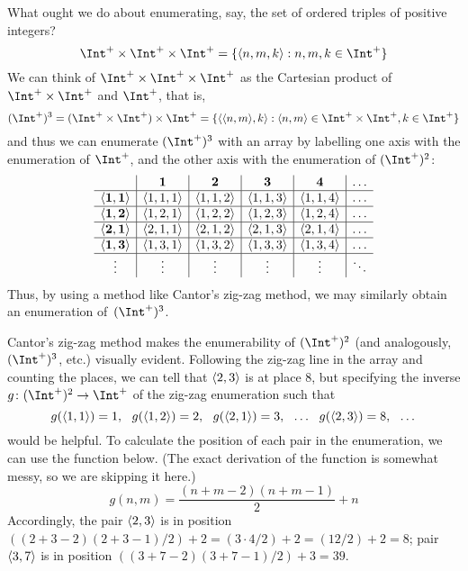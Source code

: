\documentclass[../../../include/open-logic-section]{subfiles}
\begin{document}
\begin{explain}
What ought we do about enumerating, say, the set of ordered triples
of positive integers?
\[
\Int^+ \times \Int^+ \times \Int^+ = \Setabs{\tuple{n,m,k}}{n,m,k \in \Int^+}
\]
We can think of $\Int^+ \times \Int^+ \times \Int^+$ as the Cartesian
product of $\Int^+ \times \Int^+$ and $\Int^+$, that is,
\[
(\Int^+)^3 = (\Int^+ \times \Int^+) \times \Int^+ =
\Setabs{\tuple{\tuple{n,m},k}}{\tuple{n,m} \in \Int^+ \times \Int^+, k
  \in \Int^+ }
\]
and thus we can enumerate $(\Int^+)^3$ with an array by labelling one
axis with the enumeration of $\Int^+$, and the other axis with the
enumeration of $(\Int^+)^2$:
\[
\begin{array}{ c | c | c | c | c | c}
& \textbf 1 & \textbf 2 & \textbf 3 & \textbf 4 & \dots \\
\hline
\mathbf{\tuple{1,1}} & \tuple{1,1,1} & \tuple{1,1,2} & \tuple{1,1,3} & \tuple{1,1,4} & \dots \\
\hline
\mathbf{\tuple{1,2}} & \tuple{1,2,1} & \tuple{1,2,2} & \tuple{1,2,3} & \tuple{1,2,4} & \dots \\
\hline
\mathbf{\tuple{2,1}} & \tuple{2,1,1} & \tuple{2,1,2} & \tuple{2,1,3} & \tuple{2,1,4} & \dots \\
\hline
\mathbf{\tuple{1,3}} & \tuple{1,3,1} & \tuple{1,3,2} & \tuple{1,3,3} & \tuple{1,3,4} & \dots\\
\hline
\vdots & \vdots & \vdots & \vdots & \vdots & \ddots \\
\end{array}
\]
Thus, by using a method like Cantor's zig-zag method, we may
similarly obtain an enumeration of~$(\Int^+)^3$.

Cantor's zig-zag method makes the enumerability of $(\Int^+)^2$ (and analogously, $(\Int^+)^3$, etc.) visually evident.  Following the zig-zag line in the array and counting the places, we can tell that $\langle 2,3 \rangle$ is at place 8, but specifying the inverse $g\colon (\Int^+)^2 \to \Int^+$ of the zig-zag enumeration such that
\[
g(\tuple{1,1}) = 1, \ \ g(\tuple{1,2}) = 2, \ \ g(\tuple{2,1}) = 3, \ \ \dots \ \ g(\tuple{2,3}) = 8, \ \ \dots
\]
would be helpful. To calculate the position of each pair in the enumeration, we can use the function below. (The exact derivation of the function is somewhat messy, so we are skipping it here.)
\[
g(n,m) = \frac{(n + m - 2)(n + m - 1)}{2}+n
\]
Accordingly, the pair $\langle 2,3 \rangle$ is in position $((2 + 3 - 2)(2 + 3 - 1) / 2) + 2 = (3 \cdot 4 / 2) + 2 = (12 / 2) + 2 = 8$; pair $\langle 3,7 \rangle$ is in position $((3 + 7 - 2)(3 + 7 - 1) / 2) + 3 = 39$.
\end{explain}
\end{document}
